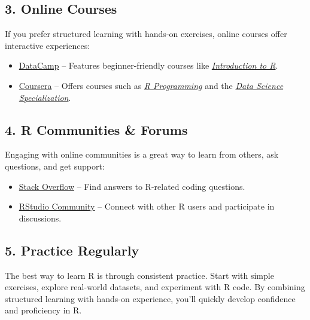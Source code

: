 \documentclass[
  11pt,
]{book}
\providecommand{\tightlist}{%
  \setlength{\itemsep}{0pt}\setlength{\parskip}{0pt}}
\theoremstyle{definition}
\theoremstyle{definition}
\theoremstyle{definition}
\theoremstyle{definition}
\theoremstyle{remark}
\begin{document}
\subsection*{3. Online Courses}\label{online-courses}


If you prefer structured learning with hands-on exercises, online courses offer interactive experiences:

\begin{itemize}
\tightlist
\item
  \href{https://www.datacamp.com}{DataCamp} -- Features beginner-friendly courses like \href{https://learn.datacamp.com/courses/free-introduction-to-r}{\emph{Introduction to R}}.\\
\item
  \href{https://www.coursera.org}{Coursera} -- Offers courses such as \href{https://www.coursera.org/learn/r-programming}{\emph{R Programming}} and the \href{https://www.coursera.org/specializations/jhu-data-science}{\emph{Data Science Specialization}}.
\end{itemize}

\subsection*{4. R Communities \& Forums}\label{r-communities-forums}


Engaging with online communities is a great way to learn from others, ask questions, and get support:

\begin{itemize}
\tightlist
\item
  \href{https://stackoverflow.com/questions/tagged/r}{Stack Overflow} -- Find answers to R-related coding questions.\\
\item
  \href{https://community.rstudio.com/}{RStudio Community} -- Connect with other R users and participate in discussions.
\end{itemize}

\subsection*{5. Practice Regularly}\label{practice-regularly}


The best way to learn R is through consistent practice. Start with simple exercises, explore real-world datasets, and experiment with R code. By combining structured learning with hands-on experience, you'll quickly develop confidence and proficiency in R.
\end{document}
